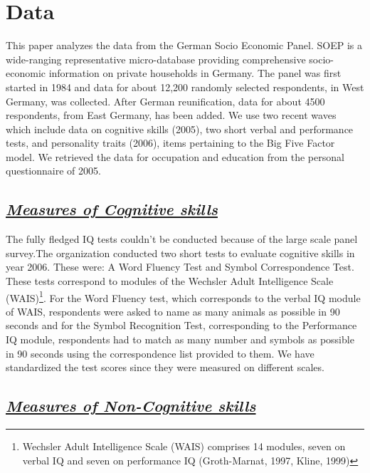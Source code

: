\documentclass[11pt, a4paper, leqno]{article}
\begin{document}
\section*{Data}

This paper analyzes the data from the German Socio Economic Panel. SOEP is a wide-ranging representative micro-database providing comprehensive socio-economic information on private households in Germany. The panel was first started in 1984 and data for about 12,200 randomly selected respondents, in West Germany, was collected. After German reunification, data for about 4500 respondents, from East Germany, has been added. We use two recent waves which include data on cognitive skills (2005), two short verbal and performance tests, and personality traits (2006), items pertaining to the Big Five Factor model. We retrieved the data for occupation and education from the personal questionnaire of 2005. 

\subsection*{\textit{\underline{Measures of Cognitive skills}}}
The fully fledged IQ tests couldn’t be conducted because of the large scale panel survey.The organization conducted two short tests to evaluate cognitive skills in year 2006. These were: A Word Fluency Test and Symbol Correspondence Test. These tests correspond to modules  of the Wechsler Adult Intelligence Scale (WAIS)\footnote{Wechsler Adult Intelligence Scale (WAIS) comprises 14 modules, seven on verbal IQ and seven on performance IQ (Groth-Marnat, 1997, Kline, 1999)}. 
For the Word Fluency test, which corresponds to the verbal IQ module of WAIS, respondents were asked to name as many animals as possible in 90 seconds and for the Symbol Recognition Test, corresponding to the Performance IQ module, respondents had to match as many number and symbols as possible in 90 seconds using the correspondence list provided to them. We have standardized the test scores since they were measured on different scales.

\subsection*{\textit{\underline{Measures of Non-Cognitive skills}}}
\end{document}
